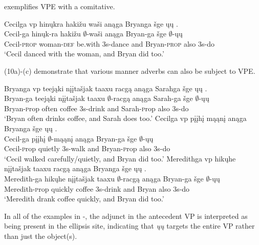 \documentclass[output=paper]{LSP/langsci}
\begin{document}
 exemplifies VPE with a comitative.

\begin{exe}
\ex
\glll Cecilga {\ob}{vp} hinųkra hakižu waši{\cb} anąga Bryanga šge {\ob}ųų{\cb} .\\
Cecil-ga {} hinųk-ra hakižu $\emptyset$-waši anąga Bryan-ga šge $\emptyset$-ųų\\
Cecil-\textsc{prop} {} woman-\textsc{def} be.with {\textsc 3s}-dance and Bryan-\textsc{prop} also {\textsc 3s}-do\\
\trans `Cecil danced with the woman, and Bryan did too.'
\end{exe}

(10a)-(c) demonstrate that various manner adverbs can also be subject to VPE.

\begin{exe}
\ex
\begin{xlist}
\ex
\glll Bryanga  {\ob}{vp} teejąki {nįįtašjak taaxu} racgą{\cb} anąga Sarahga šge {\ob}ųų{\cb} .\\ 
Bryan-ga {} teejąki {nįįtašjak taaxu} $\emptyset$-racgą anąga Sarah-ga šge $\emptyset$-ųų\\
Bryan-{\textsc prop} {} often coffee {\textsc 3s}-drink and Sarah-{\textsc prop} also {\textsc 3s}-do\\
\trans `Bryan often drinks coffee, and Sarah does too.'
\ex
\glll Cecilga  {\ob}{vp} pįįhį mąąnį{\cb} anąga Bryanga šge {\ob}ųų{\cb} .\\
Cecil-ga {} pįįhį $\emptyset$-mąąnį anąga Bryan-ga šge $\emptyset$-ųų\\
Cecil-{\textsc prop} {} quietly {\textsc 3s}-walk and Bryan-{\textsc prop} also {\textsc 3s}-do\\
\trans `Cecil walked carefully/quietly, and Bryan did too.'
\ex
\glll Meredithga {\ob}{vp} hikųhe {nįįtašjak taaxu} racgą{\cb} anąga Bryanga šge {\ob}ųų{\cb} .\\
Meredith-ga {} hikųhe {nįįtašjak taaxu} $\emptyset$-racgą anąga Bryan-ga šge $\emptyset$-ųų\\
Meredith-{\textsc prop} {} quickly coffee {\textsc 3s}-drink and Bryan also {\textsc 3s}-do\\
\trans `Meredith drank coffee quickly, and Bryan did too.'
\end{xlist}
\end{exe}

In all of the examples in -, the adjunct in the antecedent VP is interpreted as being present in the ellipsis site, indicating that \emph{ųų} targets the entire VP rather than just the object(s).
\end{document}

